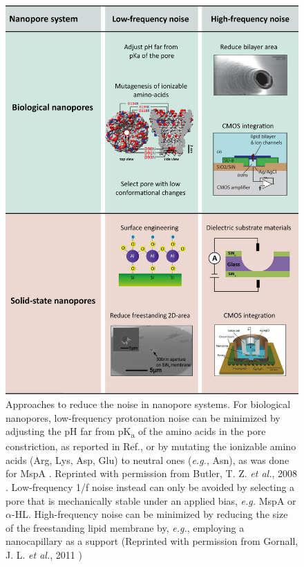 \begin{figure}[H]
	\centering
	\includegraphics[width=0.8\linewidth]{figures/Figure3.5.png}
	\caption{Approaches to reduce the noise in nanopore systems. For biological nanopores, low-frequency protonation noise can be minimized by adjusting the pH far from pK\textsubscript{a} of the amino acids in the pore constriction, as reported in Ref.\cite{Kasianowicz1993}, or by mutating the ionizable amino acids (Arg, Lys, Asp, Glu) to neutral ones (\emph{e.g.}, Asn), as was done for MspA . Reprinted with permission from Butler, T. Z. \emph{et al.}, 2008 \cite{Butler2008}.
		Low-frequency 1/f noise instead can only be avoided by selecting a pore that is mechanically stable under an applied bias, \emph{e.g.} MspA or $\alpha$-HL. High-frequency noise can be minimized by reducing the size of the freestanding lipid membrane by, \emph{e.g.}, employing a nanocapillary as a support  (Reprinted with permission from Gornall, J. L. \emph{et al.}, 2011 \cite{Gornall2011})
}
\end{figure}
